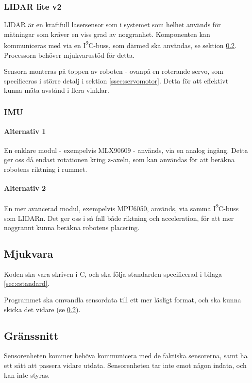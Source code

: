 \documentclass[a4paper,11pt]{article}
\begin{document}
\subsubsection{LIDAR lite v2} \label{sssec:lidar}
LIDAR är en kraftfull lasersensor som i systemet som helhet används för mätningar som kräver en viss grad av noggranhet. Komponenten kan kommuniceras med via en I\textsuperscript{2}C-buss, som därmed ska användas, se sektion \ref{ssec:sensorInterface}. Processorn behöver mjukvarustöd för detta. %

Sensorn monteras på toppen av roboten - ovanpå en roterande servo, som specificeras i större detalj i sektion \ref{ssec:servomotor}. Detta för att effektivt kunna mäta avstånd i flera vinklar.

\subsubsection{IMU} \label{sssec:imu}

\paragraph{Alternativ 1}
En enklare modul - exempelvis MLX90609 - används, via en analog ingång. Detta ger oss då endast rotationen kring z-axeln, som kan användas för att beräkna robotens riktning i rummet.

\paragraph{Alternativ 2}
En mer avancerad modul, exempelvis MPU6050, används, via samma I\textsuperscript{2}C-buss som LIDARn. Det ger oss i så fall både riktning och acceleration, för att mer noggrannt kunna beräkna robotens placering.%

\subsection{Mjukvara}

Koden ska vara skriven i C, och ska följa standarden specificerad i bilaga \ref{sec:cstandard}.

Programmet ska omvandla sensordata till ett mer läsligt format, och ska kunna skicka det vidare (se \ref{ssec:sensorInterface}).

\subsection{Gränssnitt} \label{ssec:sensorInterface}
Sensorenheten kommer behöva kommunicera med de faktiska sensorerna, samt ha ett sätt att passera vidare utdata. Sensorenheten tar inte emot någon indata, och kan inte styras.
\end{document}
